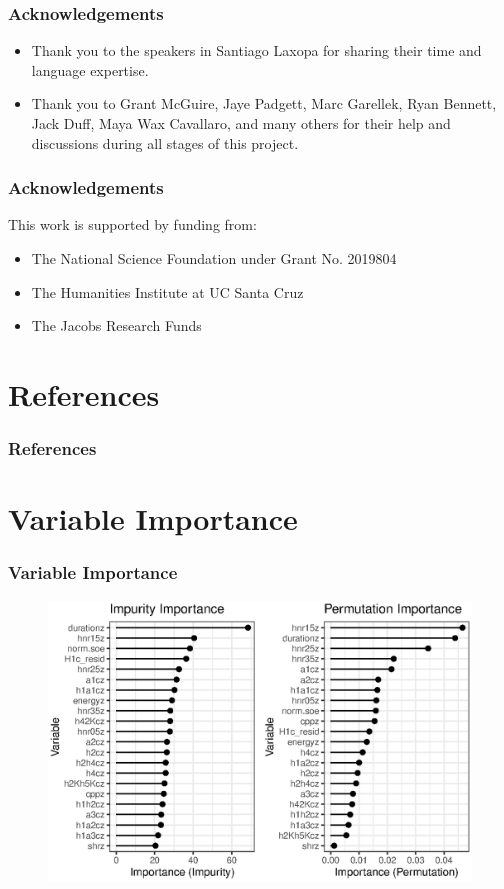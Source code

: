 \documentclass{beamer}
\begin{document}
\begin{frame}
  \frametitle{Acknowledgements}

  \begin{itemize}
    \item Thank you to the speakers in Santiago Laxopa for sharing their time and language expertise. 
    \item Thank you to Grant McGuire, Jaye Padgett, Marc Garellek, Ryan Bennett, Jack Duff, Maya Wax Cavallaro, and many others for their help and discussions during all stages of this project. 
  \end{itemize}
\end{frame}

\begin{frame}
  \frametitle{Acknowledgements}
  This work is supported by funding from: 
  \begin{itemize}
    \item The National Science Foundation under Grant No. 2019804
    \item The Humanities Institute at UC Santa Cruz 
    \item The Jacobs Research Funds
  \end{itemize}

\end{frame}

\appendix
\section{References}
\begin{frame}[t,allowframebreaks]
  \frametitle{References}
    \printbibliography
\end{frame}

\section{Variable Importance}
\begin{frame}
  \frametitle{Variable Importance}
  \begin{figure}[h!]
    \centering
    \includegraphics[width = 0.8\linewidth]{images/RandomForest/rf_dur_plots.eps}
  \end{figure}
\end{frame}
\end{document}

